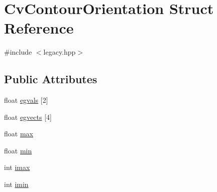 \hypertarget{structCvContourOrientation}{\section{Cv\-Contour\-Orientation Struct Reference}
\label{structCvContourOrientation}
}


{\ttfamily \#include $<$legacy.\-hpp$>$}

\subsection*{Public Attributes}
\begin{DoxyCompactItemize}
\item 
float \hyperlink{structCvContourOrientation_a3f6701ea11acb69489338bbf15f11351}{egvals} \mbox{[}2\mbox{]}
\item 
float \hyperlink{structCvContourOrientation_aacc93a6f3fcd4acc5ffc82c0be7342d3}{egvects} \mbox{[}4\mbox{]}
\item 
float \hyperlink{structCvContourOrientation_a3aea985f00b691ec5be8f20b297dd65f}{max}
\item 
float \hyperlink{structCvContourOrientation_ad8eae1d7da57b3a437d764d0f23c8439}{min}
\item 
int \hyperlink{structCvContourOrientation_ac0c9962e410023716079eb0e11f90b52}{imax}
\item 
int \hyperlink{structCvContourOrientation_ad0a335d9dafce7f86dfc9d4177260722}{imin}
\end{DoxyCompactItemize}


